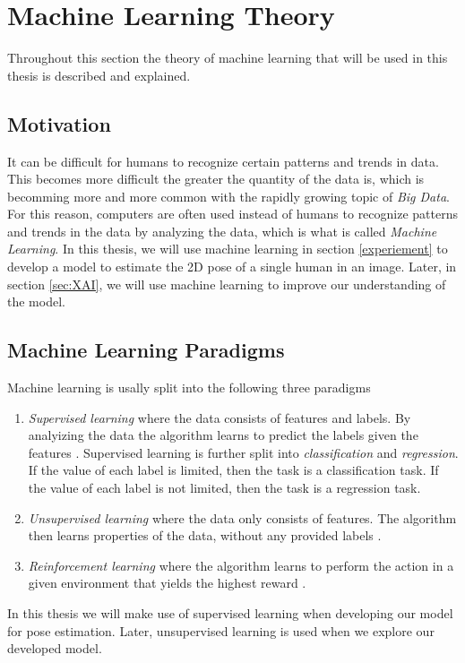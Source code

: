 \documentclass[./main.tex]{subfiles}
\begin{document}
\section{Machine Learning Theory}\label{sec:theory}
Throughout this section the theory of machine learning that will be used in this thesis is described and explained.

\subsection{Motivation}
It can be difficult for humans to recognize certain patterns and trends in data. This becomes more difficult the greater the quantity of the data is, which is becomming more and more common with the rapidly growing topic of \textit{Big Data}. For this reason, computers are often used instead of humans to recognize patterns and trends in the data by analyzing the data, which is what is called \textit{Machine Learning}. In this thesis, we will use machine learning in section \ref{experiement} to develop a model to estimate the 2D pose of a single human in an image. Later, in section \ref{sec:XAI}, we will use machine learning to improve our understanding of the model.

\subsection{Machine Learning Paradigms}
Machine learning is usally split into the following three paradigms
\begin{enumerate}
    \item \textit{Supervised learning} where the data consists of features and labels. By analyizing the data the algorithm learns to predict the labels given the features \cite{ESL}. Supervised learning is further split into \textit{classification} and \textit{regression}. If the value of each label is limited, then the task is a classification task. If the value of each label is not limited, then the task is a regression task. 
    \item \textit{Unsupervised learning} where the data only consists of features. The algorithm then learns properties of the data, without any provided labels \cite{ESL}.
    \item \textit{Reinforcement learning} where the algorithm learns to perform the action in a given environment that yields the highest reward \cite{PRML}.
\end{enumerate}
In this thesis we will make use of supervised learning when developing our model for pose estimation. Later, unsupervised learning is used when we explore our developed model.
\end{document}
